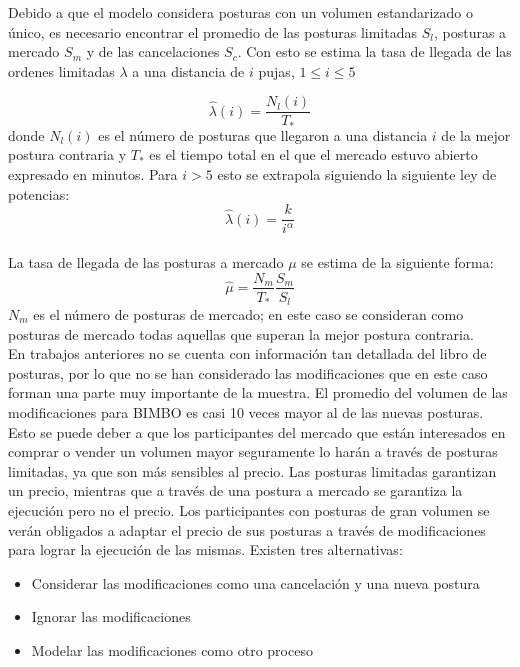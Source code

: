 \documentclass[11pt]{article}
\numberwithin{equation}{section} %
\begin{document}
Debido a que el modelo considera posturas con un volumen estandarizado o único, es necesario encontrar el promedio de las posturas limitadas $S_l$, posturas a mercado $S_m$ y de las cancelaciones $S_c$. Con esto se estima la tasa de llegada de las ordenes limitadas $\lambda$ a una distancia de $i$ pujas, $1\leq i \leq 5$

\[
\hat{\lambda}(i)=\frac{N_l(i)}{T_*}
\]
donde $N_l(i)$ es el número de posturas que llegaron a una distancia $i$ de la mejor postura contraria y $T_*$ es el tiempo total en el que el mercado estuvo abierto expresado en minutos. Para $i>5$ esto se extrapola siguiendo la siguiente ley de potencias:
\[
\hat{\lambda}(i)=\frac{k}{i^\alpha}
\]\\

La tasa de llegada de las posturas a mercado $\mu$ se estima de la siguiente forma:
\[
\hat{\mu}=\frac{N_m}{T_*}\frac{S_m}{S_l}
\]
$N_m$ es el número de posturas de mercado; en este caso se consideran como posturas de mercado todas aquellas que superan la mejor postura contraria.\\

En trabajos anteriores no se cuenta con información tan detallada del libro de posturas, por lo que no se han considerado las modificaciones que en este caso forman una parte muy importante de la muestra. El promedio del volumen de las modificaciones para BIMBO es casi 10 veces mayor al de las nuevas posturas. Esto se puede deber a que los participantes del mercado que están interesados en comprar o vender un volumen mayor seguramente lo harán a través de posturas limitadas, ya que son más sensibles al precio. Las posturas limitadas garantizan un precio, mientras que a través de una postura a mercado se garantiza la ejecución pero no el precio. Los participantes con posturas de gran volumen se verán obligados a adaptar el precio de sus posturas a través de modificaciones para lograr la ejecución de las mismas. Existen tres alternativas:
\begin{itemize}
  \item Considerar las modificaciones como una cancelación y una nueva postura
  \item Ignorar las modificaciones
  \item Modelar las modificaciones como otro proceso\\
\end{itemize}
\end{document}
